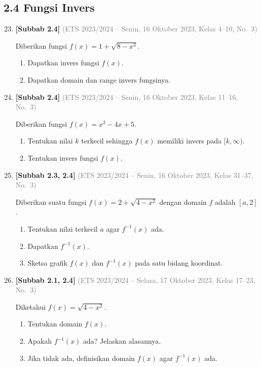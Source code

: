 \documentclass[10pt,openany,a4paper]{article}
\theoremstyle{definition}
\theoremstyle{definition}
\theoremstyle{plain}
\begin{document}
\subsection*{2.4 \quad Fungsi Invers}
\begin{enumerate}
\setcounter{enumi}{22}
    \item \textbf{[Subbab 2.4]} {\footnotesize\textcolor{gray}{(ETS 2023/2024 -- Senin, 16 Oktober 2023, Kelas 4--10, No.~3)}}\par
    Diberikan fungsi $f(x)=1+\sqrt{8-x^3}$.
    \begin{enumerate}
        \item Dapatkan invers fungsi $f(x)$.
        \item Dapatkan domain dan range invers fungsinya.
    \end{enumerate}

    \item \textbf{[Subbab 2.4]} {\footnotesize\textcolor{gray}{(ETS 2023/2024 -- Senin, 16 Oktober 2023, Kelas 11--16, No.~3)}}\par
    Diberikan fungsi $f(x)=x^2-4x+5$.
    \begin{enumerate}
        \item Tentukan nilai $k$ terkecil sehingga $f(x)$ memiliki invers pada $[k,\infty)$.
        \item Tentukan invers fungsi $f(x)$.
    \end{enumerate}

    \item \textbf{[Subbab 2.3, 2.4]} {\footnotesize\textcolor{gray}{(ETS 2023/2024 -- Senin, 16 Oktober 2023, Kelas 31--37, No.~3)}}\par
    Diberikan suatu fungsi $f(x)=2+\sqrt{4-x^2}$ dengan domain $f$ adalah $[a,2]$.
    \begin{enumerate}
        \item Tentukan nilai terkecil $a$ agar $f^{-1}(x)$ ada.
        \item Dapatkan $f^{-1}(x)$.
        \item Sketsa grafik $f(x)$ dan $f^{-1}(x)$ pada satu bidang koordinat.
    \end{enumerate}

    \item \textbf{[Subbab 2.1, 2.4]} {\footnotesize\textcolor{gray}{(ETS 2023/2024 -- Selasa, 17 Oktober 2023, Kelas 17--23, No.~3)}}\par
    Diketahui $f(x)=\sqrt{4-x^2}$.
    \begin{enumerate}
        \item Tentukan domain $f(x)$.
        \item Apakah $f^{-1}(x)$ ada? Jelaskan alasannya.
        \item Jika tidak ada, definisikan domain $f(x)$ agar $f^{-1}(x)$ ada.
    \end{enumerate}


\end{enumerate}
\end{document}
